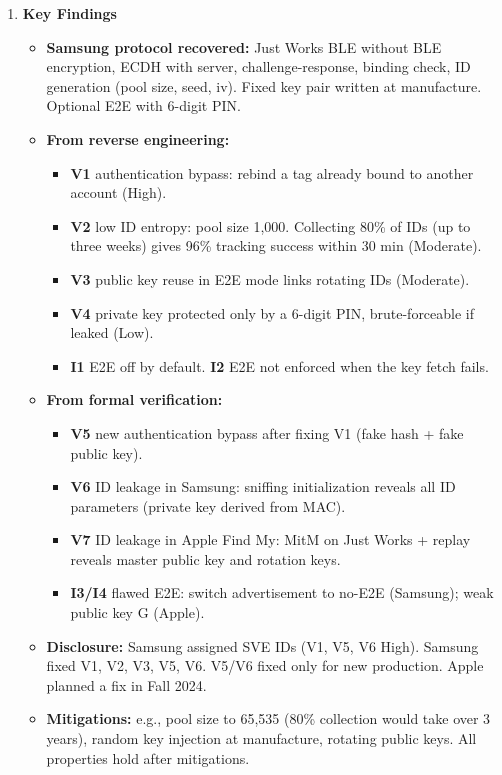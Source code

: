 \documentclass[11pt,a4paper]{article}
\newcommand{\entrypart}[1]{\textbf{\color{accent}#1}\par\vspace{2pt}}
\begin{document}
\begin{enumerate}
    \item \entrypart{Key Findings}

    \begin{itemize}
        \item \textbf{Samsung protocol recovered:} Just Works BLE without BLE encryption, ECDH with server, challenge-response, binding check, ID generation (pool size, seed, iv). Fixed key pair written at manufacture. Optional E2E with 6-digit PIN.
        \item \textbf{From reverse engineering:}
        \begin{itemize}
            \item \textbf{V1} authentication bypass: rebind a tag already bound to another account (High).
            \item \textbf{V2} low ID entropy: pool size 1,000. Collecting 80\% of IDs (up to three weeks) gives 96\% tracking success within 30 min (Moderate).
            \item \textbf{V3} public key reuse in E2E mode links rotating IDs (Moderate).
            \item \textbf{V4} private key protected only by a 6-digit PIN, brute-forceable if leaked (Low).
            \item \textbf{I1} E2E off by default. \textbf{I2} E2E not enforced when the key fetch fails.
        \end{itemize}
        \item \textbf{From formal verification:}
        \begin{itemize}
            \item \textbf{V5} new authentication bypass after fixing V1 (fake hash + fake public key).
            \item \textbf{V6} ID leakage in Samsung: sniffing initialization reveals all ID parameters (private key derived from MAC).
            \item \textbf{V7} ID leakage in Apple Find My: MitM on Just Works + replay reveals master public key and rotation keys.
            \item \textbf{I3/I4} flawed E2E: switch advertisement to no-E2E (Samsung); weak public key G (Apple).
        \end{itemize}
        \item \textbf{Disclosure:} Samsung assigned SVE IDs (V1, V5, V6 High). Samsung fixed V1, V2, V3, V5, V6. V5/V6 fixed only for new production. Apple planned a fix in Fall 2024.
        \item \textbf{Mitigations:} e.g., pool size to 65,535 (80\% collection would take over 3 years), random key injection at manufacture, rotating public keys. All properties hold after mitigations.
    \end{itemize}


\end{enumerate}
\end{document}

